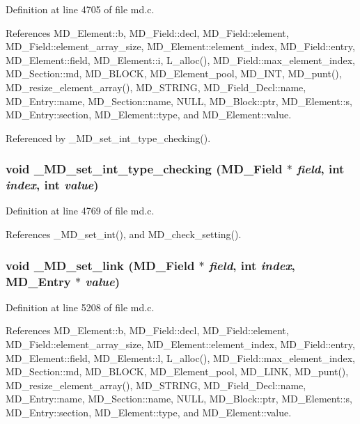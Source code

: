 Definition at line 4705 of file md.c.

References MD\_\-Element::b, MD\_\-Field::decl, MD\_\-Field::element, MD\_\-Field::element\_\-array\_\-size, MD\_\-Element::element\_\-index, MD\_\-Field::entry, MD\_\-Element::field, MD\_\-Element::i, L\_\-alloc(), MD\_\-Field::max\_\-element\_\-index, MD\_\-Section::md, MD\_\-BLOCK, MD\_\-Element\_\-pool, MD\_\-INT, MD\_\-punt(), MD\_\-resize\_\-element\_\-array(), MD\_\-STRING, MD\_\-Field\_\-Decl::name, MD\_\-Entry::name, MD\_\-Section::name, NULL, MD\_\-Block::ptr, MD\_\-Element::s, MD\_\-Entry::section, MD\_\-Element::type, and MD\_\-Element::value.

Referenced by \_\-MD\_\-set\_\-int\_\-type\_\-checking().
\subsubsection{\setlength{\rightskip}{0pt plus 5cm}void \_\-MD\_\-set\_\-int\_\-type\_\-checking (\bf{MD\_\-Field} $\ast$ {\em field}, int {\em index}, int {\em value})}\label{md_8h_0766b9d66dabf361dc6964439f5b47b7}




Definition at line 4769 of file md.c.

References \_\-MD\_\-set\_\-int(), and MD\_\-check\_\-setting().
\subsubsection{\setlength{\rightskip}{0pt plus 5cm}void \_\-MD\_\-set\_\-link (\bf{MD\_\-Field} $\ast$ {\em field}, int {\em index}, \bf{MD\_\-Entry} $\ast$ {\em value})}\label{md_8h_313759f9d424ac4215a0ae45b06a4fa6}




Definition at line 5208 of file md.c.

References MD\_\-Element::b, MD\_\-Field::decl, MD\_\-Field::element, MD\_\-Field::element\_\-array\_\-size, MD\_\-Element::element\_\-index, MD\_\-Field::entry, MD\_\-Element::field, MD\_\-Element::l, L\_\-alloc(), MD\_\-Field::max\_\-element\_\-index, MD\_\-Section::md, MD\_\-BLOCK, MD\_\-Element\_\-pool, MD\_\-LINK, MD\_\-punt(), MD\_\-resize\_\-element\_\-array(), MD\_\-STRING, MD\_\-Field\_\-Decl::name, MD\_\-Entry::name, MD\_\-Section::name, NULL, MD\_\-Block::ptr, MD\_\-Element::s, MD\_\-Entry::section, MD\_\-Element::type, and MD\_\-Element::value.

